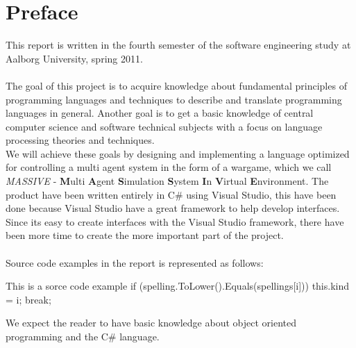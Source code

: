 \chapter*{Preface}
This report is written in the fourth semester of the software engineering study at Aalborg University, spring 2011.
\\
\\
The goal of this project is to acquire knowledge about fundamental principles of programming languages and techniques to describe and translate programming languages in general. Another goal is to get a basic knowledge of central computer science and software technical subjects with a focus on language processing theories and techniques.\\ \indent
  We will achieve these goals by designing and implementing a language optimized for controlling a multi agent system in the form of a wargame, which we call \textit{MASSIVE} - \textbf{M}ulti \textbf{A}gent \textbf{S}imulation \textbf{S}ystem \textbf{I}n \textbf{V}irtual \textbf{E}nvironment. The product have been written entirely in C\# using Visual Studio, this have been done because Visual Studio have a great framework to help develop interfaces. Since its easy to create interfaces with the Visual Studio framework, there have been more time to create the more important part of the project.
	\\
	\\

Source code examples in the report is represented as follows:
\begin{source}{This is a sorce code example}{}
if (spelling.ToLower().Equals(spellings[i]))
	{
		this.kind = i;
		break;
	}
\end{source}

We expect the reader to have basic knowledge about object oriented programming and the C\# language.